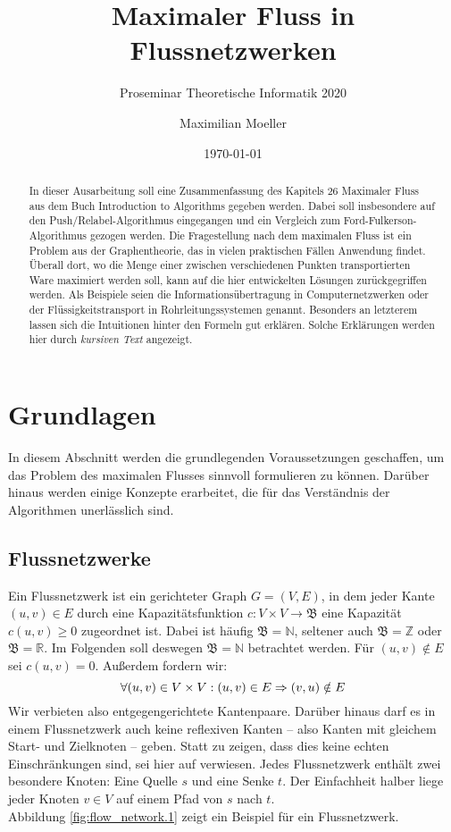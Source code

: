 \documentclass[12pt,a4paper,titlepage,onecolumn,ngerman]{scrartcl}
\author{Maximilian Moeller}
\title{Maximaler Fluss in Flussnetzwerken}
\subtitle{Proseminar Theoretische Informatik 2020}
\date{\today}
\theoremstyle{definition}
\theoremstyle{remark}
\newcommand{\ff}{Ford-Fulkerson}
\newcommand{\pr}{Push/Relabel}
\begin{document}
\maketitle
\nocite{*}

\tableofcontents

\begin{abstract}
In dieser Ausarbeitung soll eine Zusammenfassung des Kapitels 26 \glqq Maximaler Fluss\grqq{} aus dem Buch \glqq Introduction to Algorithms\grqq{} \parencite{Cormen09} gegeben werden. 
Dabei soll insbesondere auf den \pr -Algorithmus eingegangen und ein Vergleich zum \ff -Algorithmus gezogen werden.
\medbreak
Die Fragestellung nach dem maximalen Fluss ist ein Problem aus der Graphentheorie, das
in vielen praktischen Fällen Anwendung findet. 
Überall dort, wo die Menge einer zwischen verschiedenen Punkten transportierten Ware maximiert werden soll, kann auf die hier entwickelten Lösungen zurückgegriffen werden. 
Als Beispiele seien die Informationsübertragung in Computernetzwerken oder der Flüssigkeitstransport in Rohrleitungssystemen genannt. 
Besonders an letzterem lassen sich die Intuitionen hinter den Formeln gut erklären. Solche Erklärungen werden hier durch \textit{kursiven Text} angezeigt.
\end{abstract}

\section{Grundlagen}
In diesem Abschnitt werden die grundlegenden Voraussetzungen geschaffen, um das Problem des maximalen Flusses sinnvoll formulieren zu können.
Darüber hinaus werden einige Konzepte erarbeitet, die für das Verständnis der Algorithmen unerlässlich sind.

\subsection{Flussnetzwerke}
Ein Flussnetzwerk ist ein gerichteter Graph $G = (V,E)$, in dem jeder Kante $(u,v) \in E$ durch eine Kapazitätsfunktion $c: V\times V\to\mathfrak{B}$ eine Kapazität $c(u,v) \geq 0$ zugeordnet ist.
Dabei ist häufig $\mathfrak{B} = \mathbb{N}$, seltener auch $\mathfrak{B} = \mathbb{Z}$ oder $\mathfrak{B} = \mathbb{R}$.
Im Folgenden soll deswegen $\mathfrak{B} = \mathbb{N}$ betrachtet werden.
Für $(u,v) \notin E$ sei $c(u,v) = 0$.
Außerdem fordern wir:
\begin{equation} \label{no_parallel}
\forall (u,v)\in V\times V: (u,v)\in E \Rightarrow (v,u)\notin E\\
\end{equation}
Wir verbieten also entgegengerichtete Kantenpaare.
Darüber hinaus darf es in einem Flussnetzwerk auch keine reflexiven Kanten -- also Kanten mit gleichem Start- und Zielknoten -- geben.
Statt zu zeigen, dass dies keine echten Einschränkungen sind, sei hier auf \cite[][S. 724 f.]{Cormen09} verwiesen.
\medbreak
Jedes Flussnetzwerk enthält zwei besondere Knoten: Eine Quelle $s$ und eine Senke $t$.
Der Einfachheit halber liege jeder Knoten $v \in V$ auf einem Pfad von $s$ nach $t$.\\
Abbildung \ref{fig:flow_network.1} zeigt ein Beispiel für ein Flussnetzwerk.
\end{document}
